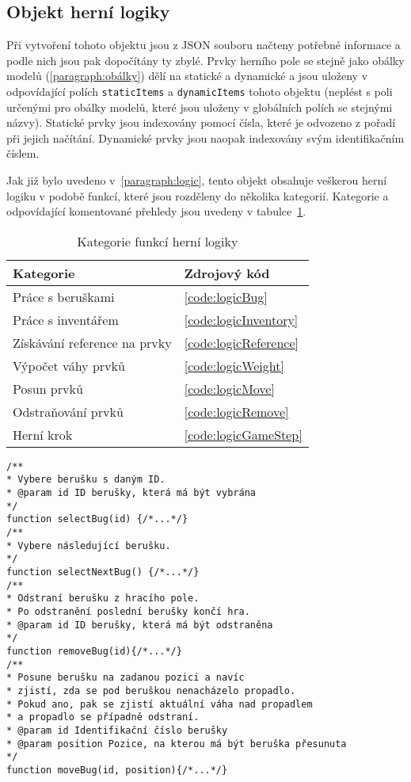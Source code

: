 \subsection*{Objekt herní logiky}
\label{section:implementationLogic}
Při vytvoření tohoto objektu jsou z JSON souboru načteny potřebné informace a podle nich jsou pak dopočítány ty zbylé. Prvky herního pole se stejně jako obálky modelů (\ref{paragraph:obálky}) dělí na statické a dynamické a jsou uloženy v odpovídající polích \texttt{staticItems} a \texttt{dynamicItems} tohoto objektu (neplést s poli určenými pro obálky modelů, které jsou uloženy v globálních polích se stejnými názvy). Statické prvky jsou indexovány pomocí čísla, které je odvozeno z pořadí při jejich načítání. Dynamické prvky jsou naopak indexovány svým identifikačním číslem. 

Jak již bylo uvedeno v~\ref{paragraph:logic}, tento objekt obsahuje veškerou herní logiku v podobě funkcí, které jsou rozděleny do několika kategorií. Kategorie a odpovídající komentované přehledy jsou uvedeny v tabulce~\ref{table:logicCategories}.

\begin{table}
\label{table:logicCategories}
\begin{center}
\begin{tabular}{ | l | l |}
\hline
\textbf{Kategorie} & \textbf{Zdrojový kód} \\ \hline
Práce s beruškami & \ref{code:logicBug} \\ \hline
Práce s inventářem & \ref{code:logicInventory}\\ \hline
Získávání reference na prvky & \ref{code:logicReference}\\ \hline
Výpočet váhy prvků & \ref{code:logicWeight} \\ \hline
Posun prvků & \ref{code:logicMove} \\ \hline
Odstraňování prvků & \ref{code:logicRemove} \\ \hline
Herní krok & \ref{code:logicGameStep}\\ \hline
\end{tabular}
\end{center}
\caption{Kategorie funkcí herní logiky}
\end{table}

\begin{lstlisting}[caption=Funkce pro práci s beruškami,label=code:logicBug]
/**
* Vybere berušku s daným ID.
* @param id ID berušky, která má být vybrána
*/
function selectBug(id) {/*...*/}
/** 
* Vybere následující berušku.
*/
function selectNextBug() {/*...*/}
/**
* Odstraní berušku z hracího pole.
* Po odstranění poslední berušky končí hra.
* @param id ID berušky, která má být odstraněna
*/
function removeBug(id){/*...*/}
/**
* Posune berušku na zadanou pozici a navíc
* zjistí, zda se pod beruškou nenacházelo propadlo.
* Pokud ano, pak se zjistí aktuální váha nad propadlem
* a propadlo se případně odstraní.
* @param id Identifikační číslo berušky
* @param position Pozice, na kterou má být beruška přesunuta
*/
function moveBug(id, position){/*...*/}
\end{lstlisting}

